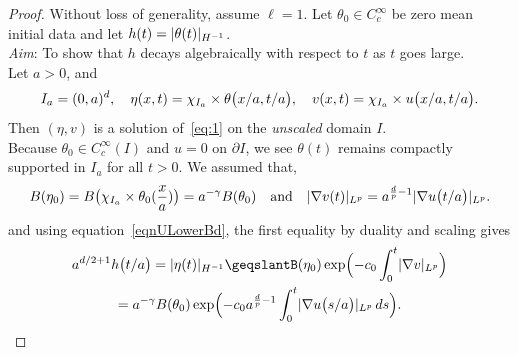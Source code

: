 \documentclass[12pt]{report}   %
\renewcommand{\geq}{\geqslant}
\newcommand{\grad}{\nabla}
\numberwithin{equation}{section}
\theoremstyle{plain}
\theoremstyle{definition}
\theoremstyle{remark}
\DeclarePairedDelimiter{\norm}{|}{|}
\DeclarePairedDelimiter{\paren}{(}{)}
\newcommand{\del}{\partial}
\begin{document}
  \begin{proof}
    Without loss of generality, assume $\ell = 1$.
    Let $\theta_0 \in C_c^\infty$ be zero mean initial data and let $h(t) = \norm{\theta(t)}_{H^{-1}}$. \\
    \textit{Aim}: To show that $h$ decays algebraically with respect to $t$ as $t$ goes large. \\
    Let $a > 0$, and 
    \[
      I_a = (0, a)^d,\quad
      \eta( x, t ) = \chi_{I_a} \times \theta\paren[\big]{ x/a, t/a },
      \quad
      v(x, t) = \chi_{I_a} \times u\paren[\big]{ x/a, t/a }.
    \]
    Then $(\eta, v)$ is a solution of~\eqref{eq:1} on the \emph{unscaled} domain $I$. \\
    Because $\theta_0 \in C_c^\infty(I)$  and $u = 0$ on $\del I$, we see $\theta(t)$ remains compactly supported in $I_a$ for all $t >0$.
    We assumed that,
    \[
     B(\eta_0) = B\big(\chi_{I_a}\times\theta_0(\frac{x}{a})\big)  =  a^{-\gamma}B(\theta_0)
      \quad\text{and}\quad
      \norm{\grad v(t)}_{L^p} = a^{\frac{d}{p} - 1} \norm{\grad u\paren[\big]{t/a } }_{L^p}.
    \]
    and using equation~\eqref{eqnULowerBd}, the first equality by duality and scaling gives
    \begin{multline*}
      a^{d/2+1} h\paren[\big]{t/a}
      = \norm{\eta(t)}_{H^{-1}}
	\geq %
       B(\eta_0)
	  \exp\paren[\Big]{ -c_0 \int_0^t \norm{\grad v}_{L^p} }\\
	= %
       a^{-\gamma}B(\theta_0)
	  \exp\paren[\Big]{ -c_0 a^{\frac{d}{p} - 1} \int_0^t \norm{\grad u\paren[\big]{ s/a }}_{L^p} \, ds }.
    \end{multline*}
    


\end{proof}
\end{document}
